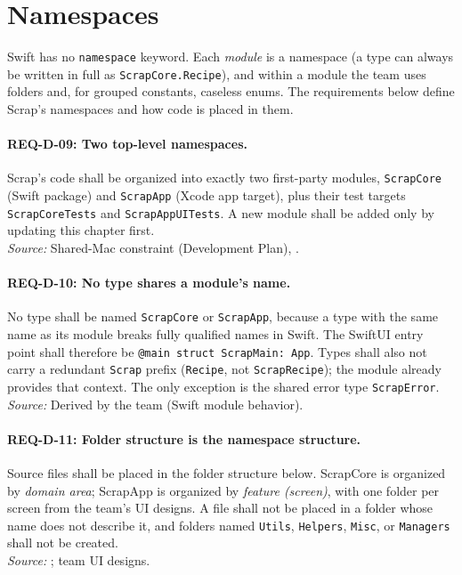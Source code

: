 \section{Namespaces}

Swift has no \texttt{namespace} keyword. Each \emph{module} is a namespace (a type can always be written in full as \texttt{ScrapCore.Recipe}), and within a module the team uses folders and, for grouped constants, caseless enums. The requirements below define Scrap's namespaces and how code is placed in them.

\paragraph{REQ-D-09: Two top-level namespaces.}
 Scrap's code shall be organized into exactly two first-party modules, \texttt{ScrapCore} (Swift package) and \texttt{ScrapApp} (Xcode app target), plus their test targets \texttt{ScrapCoreTests} and \texttt{ScrapAppUITests}. A new module shall be added only by updating this chapter first.\\
\textit{Source:} Shared-Mac constraint (Development Plan), .

\paragraph{REQ-D-10: No type shares a module's name.}
 No type shall be named \texttt{ScrapCore} or \texttt{ScrapApp}, because a type with the same name as its module breaks fully qualified names in Swift. The SwiftUI entry point shall therefore be \texttt{@main struct ScrapMain: App}. Types shall also not carry a redundant \texttt{Scrap} prefix (\texttt{Recipe}, not \texttt{ScrapRecipe}); the module already provides that context. The only exception is the shared error type \texttt{ScrapError}.\\
\textit{Source:} Derived by the team (Swift module behavior).

\paragraph{REQ-D-11: Folder structure is the namespace structure.}
 Source files shall be placed in the folder structure below. ScrapCore is organized by \emph{domain area}; ScrapApp is organized by \emph{feature (screen)}, with one folder per screen from the team's UI designs. A file shall not be placed in a folder whose name does not describe it, and folders named \texttt{Utils}, \texttt{Helpers}, \texttt{Misc}, or \texttt{Managers} shall not be created.\\
\textit{Source:} ; team UI designs.

